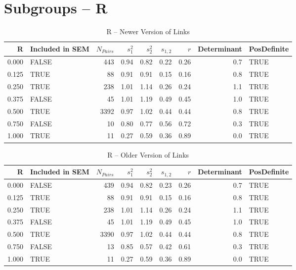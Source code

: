 \documentclass{article}\usepackage{graphicx, color}
\begin{document}
\section{Subgroups --  R }%
\begin{table}[ht]
\begin{center}
\begin{tabular}{rlrrrrrrl}
  \hline
R & Included in SEM & $N_{Pairs}$ & $s_1^2$ & $s_2^2$ & $s_{1,2}$ & $r$ & Determinant & PosDefinite \\ 
  \hline
0.000 & FALSE & 443 & 0.94 & 0.82 & 0.22 & 0.26 & 0.7 & TRUE \\ 
  0.125 & TRUE & 88 & 0.91 & 0.91 & 0.15 & 0.16 & 0.8 & TRUE \\ 
  0.250 & TRUE & 238 & 1.01 & 1.14 & 0.26 & 0.24 & 1.1 & TRUE \\ 
  0.375 & FALSE & 45 & 1.01 & 1.19 & 0.49 & 0.45 & 1.0 & TRUE \\ 
  0.500 & TRUE & 3392 & 0.97 & 1.02 & 0.44 & 0.44 & 0.8 & TRUE \\ 
  0.750 & FALSE & 10 & 0.80 & 0.77 & 0.56 & 0.72 & 0.3 & TRUE \\ 
  1.000 & TRUE & 11 & 0.27 & 0.59 & 0.36 & 0.89 & 0.0 & TRUE \\ 
   \hline
\end{tabular}
\caption{R -- Newer Version of Links}
\end{center}
\end{table}
\begin{table}[ht]
\begin{center}
\begin{tabular}{rlrrrrrrl}
  \hline
R & Included in SEM & $N_{Pairs}$ & $s_1^2$ & $s_2^2$ & $s_{1,2}$ & $r$ & Determinant & PosDefinite \\ 
  \hline
0.000 & FALSE & 439 & 0.94 & 0.82 & 0.23 & 0.26 & 0.7 & TRUE \\ 
  0.125 & TRUE & 88 & 0.91 & 0.91 & 0.15 & 0.16 & 0.8 & TRUE \\ 
  0.250 & TRUE & 238 & 1.01 & 1.14 & 0.26 & 0.24 & 1.1 & TRUE \\ 
  0.375 & FALSE & 45 & 1.01 & 1.19 & 0.49 & 0.45 & 1.0 & TRUE \\ 
  0.500 & TRUE & 3390 & 0.97 & 1.02 & 0.44 & 0.44 & 0.8 & TRUE \\ 
  0.750 & FALSE & 13 & 0.85 & 0.57 & 0.42 & 0.61 & 0.3 & TRUE \\ 
  1.000 & TRUE & 11 & 0.27 & 0.59 & 0.36 & 0.89 & 0.0 & TRUE \\ 
   \hline
\end{tabular}
\caption{R -- Older Version of Links}
\end{center}
\end{table}
\newpage 
\end{document}
